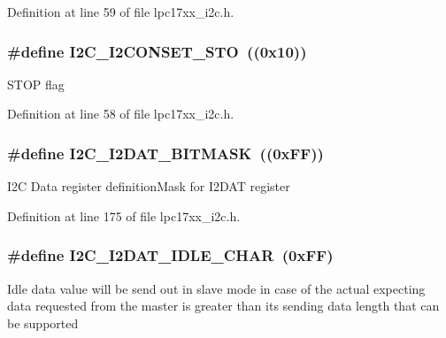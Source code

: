 Definition at line 59 of file lpc17xx\+\_\+i2c.\+h.

\subsubsection[{\texorpdfstring{I2\+C\+\_\+\+I2\+C\+O\+N\+S\+E\+T\+\_\+\+S\+TO}{I2C_I2CONSET_STO}}]{\setlength{\rightskip}{0pt plus 5cm}\#define I2\+C\+\_\+\+I2\+C\+O\+N\+S\+E\+T\+\_\+\+S\+TO~((0x10))}\hypertarget{group___i2_c___private___macros_gaae292803a059b84eac20ab8777d113af}{}\label{group___i2_c___private___macros_gaae292803a059b84eac20ab8777d113af}
S\+T\+OP flag 

Definition at line 58 of file lpc17xx\+\_\+i2c.\+h.

\subsubsection[{\texorpdfstring{I2\+C\+\_\+\+I2\+D\+A\+T\+\_\+\+B\+I\+T\+M\+A\+SK}{I2C_I2DAT_BITMASK}}]{\setlength{\rightskip}{0pt plus 5cm}\#define I2\+C\+\_\+\+I2\+D\+A\+T\+\_\+\+B\+I\+T\+M\+A\+SK~((0x\+F\+F))}\hypertarget{group___i2_c___private___macros_gac66b7c81c93cc59f69d204b4eb7d639b}{}\label{group___i2_c___private___macros_gac66b7c81c93cc59f69d204b4eb7d639b}
I2C Data register definition\+Mask for I2\+D\+AT register 

Definition at line 175 of file lpc17xx\+\_\+i2c.\+h.

\subsubsection[{\texorpdfstring{I2\+C\+\_\+\+I2\+D\+A\+T\+\_\+\+I\+D\+L\+E\+\_\+\+C\+H\+AR}{I2C_I2DAT_IDLE_CHAR}}]{\setlength{\rightskip}{0pt plus 5cm}\#define I2\+C\+\_\+\+I2\+D\+A\+T\+\_\+\+I\+D\+L\+E\+\_\+\+C\+H\+AR~(0x\+F\+F)}\hypertarget{group___i2_c___private___macros_ga5b04af302e0e4007df123dff0328ac5e}{}\label{group___i2_c___private___macros_ga5b04af302e0e4007df123dff0328ac5e}
Idle data value will be send out in slave mode in case of the actual expecting data requested from the master is greater than its sending data length that can be supported 


